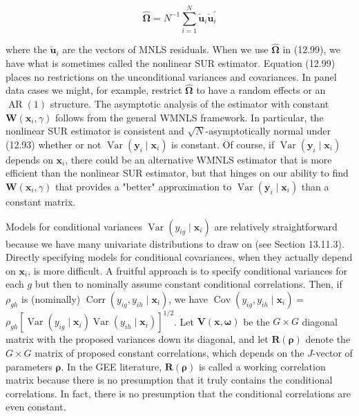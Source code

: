 \documentclass[10pt]{article}
\begin{document}
\begin{equation*}
\hat{\boldsymbol{\Omega}}=N^{-1} \sum_{i=1}^{N} \check{\mathbf{u}}_{i} \check{\mathbf{u}}_{i}^{\prime} \tag{12.99}
\end{equation*}


where the $\check{\mathbf{u}}_{i}$ are the vectors of MNLS residuals. When we use $\hat{\boldsymbol{\Omega}}$ in (12.99), we have what is sometimes called the nonlinear SUR estimator. Equation (12.99) places no restrictions on the unconditional variances and covariances. In panel data cases we might, for example, restrict $\hat{\boldsymbol{\Omega}}$ to have a random effects or an $\operatorname{AR}(1)$ structure. The asymptotic analysis of the estimator with constant $\mathbf{W}\left(\mathbf{x}_{i}, \gamma\right)$ follows from the general WMNLS framework. In particular, the nonlinear SUR estimator is consistent and $\sqrt{N}$-asymptotically normal under (12.93) whether or not $\operatorname{Var}\left(\mathbf{y}_{i} \mid \mathbf{x}_{i}\right)$ is constant. Of course, if $\operatorname{Var}\left(\mathbf{y}_{i} \mid \mathbf{x}_{i}\right)$ depends on $\mathbf{x}_{i}$, there could be an alternative WMNLS estimator that is more efficient than the nonlinear SUR estimator, but that hinges on our ability to find $\mathbf{W}\left(\mathbf{x}_{i}, \gamma\right)$ that provides a "better" approximation to $\operatorname{Var}\left(\mathbf{y}_{i} \mid \mathbf{x}_{i}\right)$ than a constant matrix.

Models for conditional variances $\operatorname{Var}\left(y_{i g} \mid \mathbf{x}_{i}\right)$ are relatively straightforward because we have many univariate distributions to draw on (see Section 13.11.3). Directly specifying models for conditional covariances, when they actually depend on $\mathbf{x}_{i}$, is more difficult. A fruitful approach is to specify conditional variances for each $g$ but then to nominally assume constant conditional correlations. Then, if $\rho_{g h}$ is (nominally) $\operatorname{Corr}\left(y_{i g}, y_{i h} \mid \mathbf{x}_{i}\right)$, we have $\operatorname{Cov}\left(y_{i g}, y_{i h} \mid \mathbf{x}_{i}\right)=$\\
$\rho_{g h}\left[\operatorname{Var}\left(y_{i g} \mid \mathbf{x}_{i}\right) \operatorname{Var}\left(y_{i h} \mid \mathbf{x}_{i}\right)\right]^{1 / 2}$. Let $\mathbf{V}(\mathbf{x}, \boldsymbol{\omega})$ be the $G \times G$ diagonal matrix with the proposed variances down its diagonal, and let $\mathbf{R}(\boldsymbol{\rho})$ denote the $G \times G$ matrix of proposed constant correlations, which depends on the $J$-vector of parameters $\boldsymbol{\rho}$. In the GEE literature, $\mathbf{R}(\boldsymbol{\rho})$ is called a working correlation matrix because there is no presumption that it truly contains the conditional correlations. In fact, there is no presumption that the conditional correlations are even constant.
\end{document}

